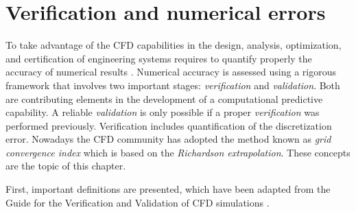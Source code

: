 \chapter{Verification and numerical errors}

To take advantage of the CFD capabilities in the design, analysis, optimization, and certification of engineering systems requires to quantify properly the accuracy of numerical results \cite{Roy2003b}. Numerical accuracy is assessed using a rigorous framework that involves two important stages: \textit{verification} and \textit{validation}. Both are contributing elements in the development of a computational predictive capability. A reliable \textit{validation} is only possible if a proper \textit{verification} was performed previously. Verification includes quantification of the discretization error. Nowadays the CFD community has adopted the method known as \textit{grid convergence index} which is based on the \textit{Richardson extrapolation}. These concepts are the topic of this chapter.

First, important definitions are presented, which have been adapted from the Guide for the Verification and Validation of CFD simulations \cite{Aiaa2002} \cite{Ihme2019}.

